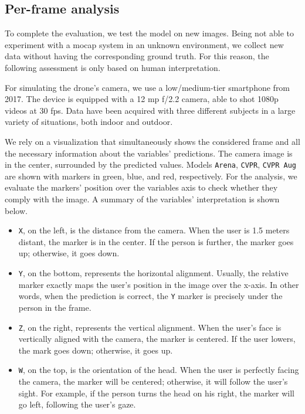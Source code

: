\subsection{Per-frame analysis}
\label{subsec:ql-interactive}

To complete the evaluation, we test the model on new images. Being not able to experiment with a \gls{mocap} system in an unknown environment, we collect new data without having the corresponding ground truth. For this reason, the following assessment is only based on human interpretation.

For simulating the drone's camera, we use a low/medium-tier smartphone from 2017. The device is equipped with a 12 \gls{mp} f/2.2 camera, able to shot 1080p videos at 30 \gls{fps}. Data have been acquired with three different subjects in a large variety of situations, both indoor and outdoor.

We rely on a visualization that simultaneously shows the considered frame and all the necessary information about the variables' predictions. The camera image is in the center, surrounded by the predicted values. Models \texttt{Arena}, \texttt{CVPR}, \texttt{CVPR Aug} are shown with markers in green, blue, and red, respectively. For the analysis, we evaluate the markers' position over the variables axis to check whether they comply with the image. A summary of the variables' interpretation is shown below.

\begin{itemize}
    \item \texttt{X}, on the left, is the distance from the camera. When the user is 1.5 meters distant, the marker is in the center. If the person is further, the marker goes up; otherwise, it goes down.
    \item \texttt{Y}, on the bottom, represents the horizontal alignment. Usually, the relative marker exactly maps the user's position in the image over the x-axis. In other words, when the prediction is correct, the \texttt{Y} marker is precisely under the person in the frame.
    \item \texttt{Z}, on the right, represents the vertical alignment. When the user's face is vertically aligned with the camera, the marker is centered.
    If the user lowers, the mark goes down; otherwise, it goes up.
    \item \texttt{W}, on the top, is the orientation of the head. When the user is perfectly facing the camera, the marker will be centered; otherwise, it will follow the user's sight. For example, if the person turns the head on his right, the marker will go left, following the user's gaze.
\end{itemize}

